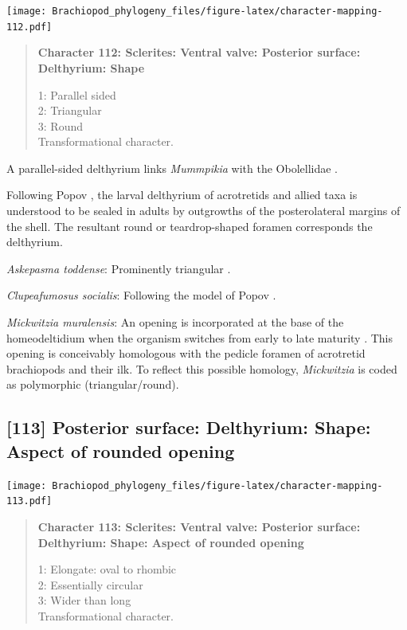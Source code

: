 \documentclass[openany]{book}
\begin{document}
\texttt{[image: Brachiopod\_phylogeny\_files/figure-latex/character-mapping-112.pdf]}

\begin{quote}
\textbf{Character 112: Sclerites: Ventral valve: Posterior surface:
Delthyrium: Shape}

1: Parallel sided\\
2: Triangular\\
3: Round\\
Transformational character.
\end{quote}

A parallel-sided delthyrium links \emph{Mummpikia} with the Obolellidae
\citep{Balthasar2008iMummpikia}.

Following Popov \citeyearpar{Popov1992TheCambrian}, the larval
delthyrium of acrotretids and allied taxa is understood to be sealed in
adults by outgrowths of the posterolateral margins of the shell. The
resultant round or teardrop-shaped foramen corresponds the delthyrium.

\hypertarget{Askepasma_toddense-coding-112}{}
\emph{Askepasma toddense}: Prominently triangular \citep[see][fig.
2]{Topper2013Theoldest}.

\hypertarget{Clupeafumosus_socialis-coding-112}{}
\emph{Clupeafumosus socialis}: Following the model of Popov
\citeyearpar{Popov1992TheCambrian}.

\hypertarget{Mickwitzia_muralensis-coding-112}{}
\emph{Mickwitzia muralensis}: An opening is incorporated at the base of
the homeodeltidium when the organism switches from early to late
maturity \citep[fig. 10 in][]{Balthasar2004Shellstructure}. This opening
is conceivably homologous with the pedicle foramen of acrotretid
brachiopods and their ilk. To reflect this possible homology,
\emph{Mickwitzia} is coded as polymorphic (triangular/round).

\subsection*{{[}113{]} Posterior surface: Delthyrium: Shape: Aspect of
rounded
opening}\label{posterior-surface-delthyrium-shape-aspect-of-rounded-opening}

\texttt{[image: Brachiopod\_phylogeny\_files/figure-latex/character-mapping-113.pdf]}

\begin{quote}
\textbf{Character 113: Sclerites: Ventral valve: Posterior surface:
Delthyrium: Shape: Aspect of rounded opening}

1: Elongate: oval to rhombic\\
2: Essentially circular\\
3: Wider than long\\
Transformational character.
\end{quote}
\end{document}
